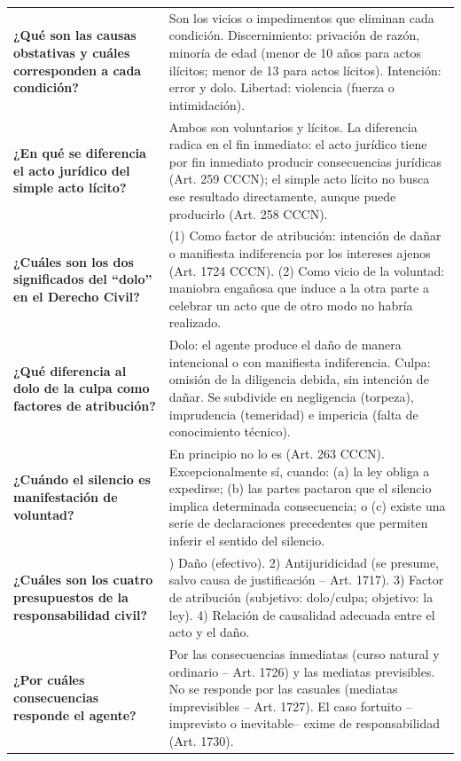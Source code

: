 \documentclass[12pt,oneside]{book}
\begin{document}
\begin{longtable}{
    >{\raggedright\arraybackslash}p{}
    >{\raggedright\arraybackslash}p{}
}
\textbf{¿Qué son las causas obstativas y cuáles corresponden a cada condición?} &
Son los vicios o impedimentos que eliminan cada condición. Discernimiento: privación de razón, minoría de edad (menor de 10 años para actos ilícitos; menor de 13 para actos lícitos). Intención: error y dolo. Libertad: violencia (fuerza o intimidación). \\

\textbf{¿En qué se diferencia el acto jurídico del simple acto lícito?} &
Ambos son voluntarios y lícitos. La diferencia radica en el fin inmediato: el acto jurídico tiene por fin inmediato producir consecuencias jurídicas (Art. 259 CCCN); el simple acto lícito no busca ese resultado directamente, aunque puede producirlo (Art. 258 CCCN). \\

\textbf{¿Cuáles son los dos significados del ``dolo'' en el Derecho Civil?} &
(1) Como factor de atribución: intención de dañar o manifiesta indiferencia por los intereses ajenos (Art. 1724 CCCN). (2) Como vicio de la voluntad: maniobra engañosa que induce a la otra parte a celebrar un acto que de otro modo no habría realizado. \\

\textbf{¿Qué diferencia al dolo de la culpa como factores de atribución?} &
Dolo: el agente produce el daño de manera intencional o con manifiesta indiferencia. Culpa: omisión de la diligencia debida, sin intención de dañar. Se subdivide en negligencia (torpeza), imprudencia (temeridad) e impericia (falta de conocimiento técnico). \\

\textbf{¿Cuándo el silencio es manifestación de voluntad?} &
En principio no lo es (Art. 263 CCCN). Excepcionalmente sí, cuando: (a) la ley obliga a expedirse; (b) las partes pactaron que el silencio implica determinada consecuencia; o (c) existe una serie de declaraciones precedentes que permiten inferir el sentido del silencio. \\

\textbf{¿Cuáles son los cuatro presupuestos de la responsabilidad civil?} &
1) Daño (efectivo). 2) Antijuridicidad (se presume, salvo causa de justificación -- Art. 1717). 3) Factor de atribución (subjetivo: dolo/culpa; objetivo: la ley). 4) Relación de causalidad adecuada entre el acto y el daño. \\

\textbf{¿Por cuáles consecuencias responde el agente?} &
Por las consecuencias inmediatas (curso natural y ordinario -- Art. 1726) y las mediatas previsibles. No se responde por las casuales (mediatas imprevisibles -- Art. 1727). El caso fortuito --imprevisto o inevitable-- exime de responsabilidad (Art. 1730). \\


\end{longtable}
\end{document}
